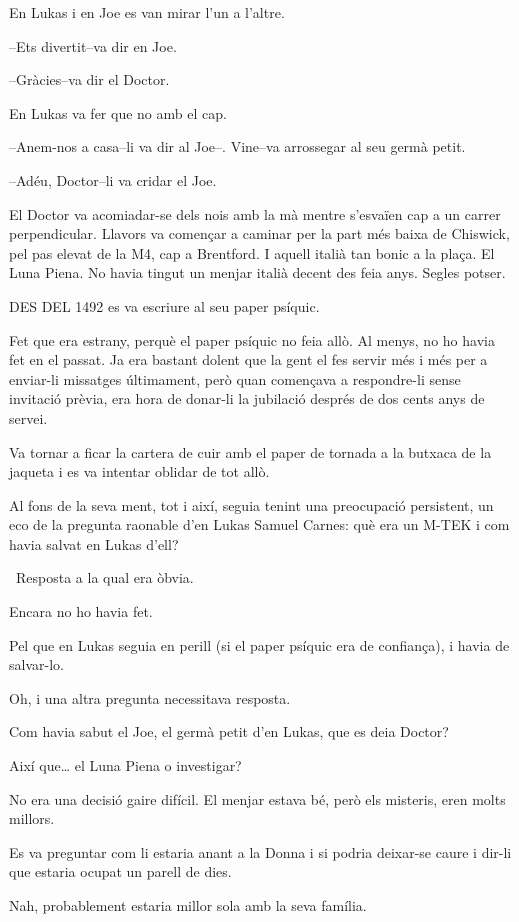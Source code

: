 En Lukas i en Joe es van mirar l'un a l'altre.

--Ets divertit--va dir en Joe.

--Gràcies--va dir el Doctor.

En Lukas va fer que no amb el cap.

--Anem-nos a casa--li va dir al Joe--. Vine--va arrossegar al seu germà
petit.

--Adéu, Doctor--li va cridar el Joe.

El Doctor va acomiadar-se dels nois amb la mà mentre s'esvaïen cap a un
carrer perpendicular. Llavors va començar a caminar per la part més
baixa de Chiswick, pel pas elevat de la M4, cap a Brentford. I aquell
italià tan bonic a la plaça. El Luna Piena. No havia tingut un menjar
italià decent des feia anys. Segles potser.

DES DEL 1492 es va escriure al seu paper psíquic.

Fet que era estrany, perquè el paper psíquic no feia allò. Al menys, no
ho havia fet en el passat. Ja era bastant dolent que la gent el fes
servir més i més per a enviar-li missatges últimament, però quan
començava a respondre-li sense invitació prèvia, era hora de donar-li la
jubilació després de dos cents anys de servei.

Va tornar a ficar la cartera de cuir amb el paper de tornada a la
butxaca de la jaqueta i es va intentar oblidar de tot allò.

Al fons de la seva ment, tot i així, seguia tenint una preocupació
persistent, un eco de la pregunta raonable d'en Lukas Samuel Carnes: què
era un M-TEK i com havia salvat en Lukas d'ell?

~Resposta a la qual era òbvia.

Encara no ho havia fet.

Pel que en Lukas seguia en perill (si el paper psíquic era de
confiança), i havia de salvar-lo.

Oh, i una altra pregunta necessitava resposta.

Com havia sabut el Joe, el germà petit d'en Lukas, que es deia Doctor?

Així que\ldots{} el Luna Piena o investigar?

No era una decisió gaire difícil. El menjar estava bé, però els
misteris, eren molts millors.

Es va preguntar com li estaria anant a la Donna i si podria deixar-se
caure i dir-li que estaria ocupat un parell de dies.

Nah, probablement estaria millor sola amb la seva família.

